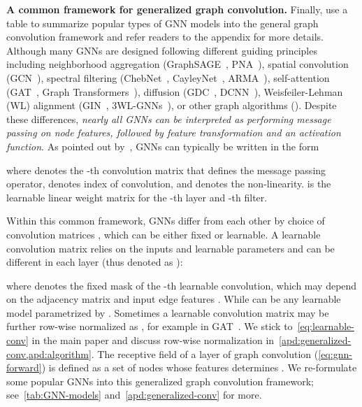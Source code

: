 \documentclass{article}
\begin{document}
\textbf{A common framework for generalized graph convolution.}
Finally, use a table to summarize popular types of GNN models into the general graph convolution framework and refer readers to the appendix for more details.
Although many GNNs are designed following different guiding principles including neighborhood aggregation (GraphSAGE~\citep{hamilton2017inductive}, PNA~\citep{corso2020principal}), spatial convolution (GCN~\citep{kipf2016semi}), spectral filtering (ChebNet~\citep{defferrard2016convolutional}, CayleyNet~\citep{levie2018cayleynets}, ARMA~\citep{bianchi2021graph}), self-attention (GAT~\citep{velivckovic2017graph}, Graph Transformers~\citep{yaronlipman2020global, rong2020self, zhang2020graph}), diffusion (GDC~\citep{klicpera2019diffusion}, DCNN~\citep{atwood2016diffusion}), Weisfeiler-Lehman (WL) alignment (GIN~\citep{xu2018powerful}, 3WL-GNNs~\citep{morris2019weisfeiler, maron2019provably}), or other graph algorithms (\citep{xu2019can, loukas2019graph}).  Despite these differences, {\em nearly all GNNs can be interpreted as performing message passing on node features, followed by feature transformation and an activation function}. As pointed out by~\citet{balcilar2021analyzing}, GNNs can typically be written in the form

where  denotes the -th convolution matrix that defines the message passing operator,  denotes index of convolution, and  denotes the non-linearity.  is the learnable linear weight matrix for the -th layer and -th filter. 

Within this common framework, GNNs differ from each other by choice of convolution matrices , which can be either fixed or learnable. A learnable convolution matrix relies on the inputs and learnable parameters and can be different in each layer (thus denoted as ):

where  denotes the fixed mask of the -th learnable convolution, which may depend on the adjacency matrix  and input edge features . While  can be any learnable model parametrized by . Sometimes a learnable convolution matrix may be further row-wise normalized as , for example in GAT~\citep{velivckovic2017graph}. We stick to~\cref{eq:learnable-conv} in the main paper and discuss row-wise normalization in~\cref{apd:generalized-conv,apd:algorithm}. The receptive field of a layer of graph convolution (\cref{eq:gnn-forward}) is defined as a set of nodes  whose features  determines . We re-formulate some popular GNNs into this generalized graph convolution framework; see~\cref{tab:GNN-models} and~\cref{apd:generalized-conv} for more.
\end{document}
